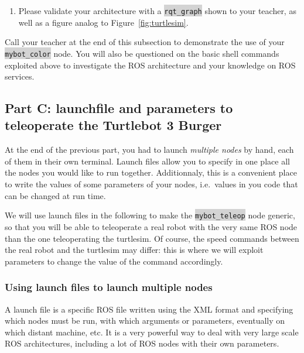 \documentclass[10pt,a4paper,printanswers]{upmc}
\newcounter{mainmemorder}
\newcommand{\load}{\setcounter{enumi}{\value{mainmemorder}}}
\newcommand{\mytext}[1]{\colorbox{lightgray}{\texttt{#1}}}
\newcommand{\subsecline}{\texorpdfstring{\hrulefill}{}}
\begin{document}
\begin{enumerate}
  \load
  \item Please validate your architecture with a \mytext{rqt\_graph} shown to your teacher, as well
        as a figure analog to Figure~\ref{fig:turtlesim}.
\end{enumerate}

\begin{mdframed}[style=evaluation]
  Call your teacher at the end of this subsection to demonstrate the use of your
  \mytext{mybot\_color} node. You will also be questioned on the basic shell commands exploited
  above to investigate the ROS architecture and your knowledge on ROS services.
\end{mdframed}


\newpage
\subsection{Part C: launchfile and parameters to teleoperate the Turtlebot 3 Burger \subsecline}

At the end of the previous part, you had to launch \textit{multiple nodes} by hand, each of them in
their own terminal. Launch files allow you to specify in one place all the nodes you would like to
run together. Additionnaly, this is a convenient place to write the values of some parameters of
your nodes, i.e.\ values in you code that can be changed at run time.

We will use launch files in the following to make the \mytext{mybot\_teleop} node generic, so that
you will be able to teleoperate a real robot with the very same ROS node than the one teleoperating
the turtlesim. Of course, the speed commands between the real robot and the turtlesim may differ:
this is where we will exploit parameters to change the value of the command accordingly.

\subsubsection{Using launch files to launch multiple nodes}
A launch file is a specific ROS file written using the XML format and specifying which nodes must
be run, with which arguments or parameters, eventually on which distant machine, etc. It is a very
powerful way to deal with very large scale ROS architectures, including a lot of ROS nodes with
their own parameters.
\end{document}
